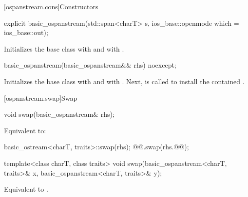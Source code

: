 [ospanstream.cons]{Constructors}

%
\begin{itemdecl}
explicit basic_ospanstream(std::span<charT> s,
                           ios_base::openmode which = ios_base::out);
\end{itemdecl}

\begin{itemdescr}
\pnum
\effects
Initializes the base class with
and  with
.
\end{itemdescr}

%
\begin{itemdecl}
basic_ospanstream(basic_ospanstream&& rhs) noexcept;
\end{itemdecl}

\begin{itemdescr}
\pnum
\effects
Initializes the base class with 
and  with .
Next, 
is called to install the contained .
\end{itemdescr}

[ospanstream.swap]{Swap}

%
\begin{itemdecl}
void swap(basic_ospanstream& rhs);
\end{itemdecl}

\begin{itemdescr}
\pnum
\effects
Equivalent to:
\begin{codeblock}
basic_ostream<charT, traits>::swap(rhs);
@@.swap(rhs.@@);
\end{codeblock}
\end{itemdescr}

%
\begin{itemdecl}
template<class charT, class traits>
  void swap(basic_ospanstream<charT, traits>& x, basic_ospanstream<charT, traits>& y);
\end{itemdecl}

\begin{itemdescr}
\pnum
\effects
Equivalent to .
\end{itemdescr}

